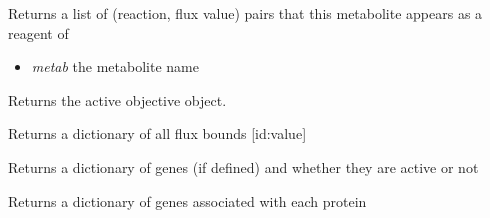 \documentclass[a4paper,11pt,english]{sphinxmanual}
\begin{document}
\begin{fulllineitems}
\begin{fulllineitems}
\end{fulllineitems}


\begin{fulllineitems}
\label{modules_doc:cbmpy.CBModel.Model.findFluxesForConnectedSpecies}
Returns a list of (reaction, flux value) pairs that this metabolite appears as a reagent of
\begin{itemize}
\item {} 
\emph{metab} the metabolite name

\end{itemize}

\end{fulllineitems}


\begin{fulllineitems}
\label{modules_doc:cbmpy.CBModel.Model.getActiveObjective}
Returns the active objective object.

\end{fulllineitems}


\begin{fulllineitems}
\label{modules_doc:cbmpy.CBModel.Model.getAllFluxBounds}
Returns a dictionary of all flux bounds {[}id:value{]}

\end{fulllineitems}


\begin{fulllineitems}
\label{modules_doc:cbmpy.CBModel.Model.getAllGeneActivities}
Returns a dictionary of genes (if defined) and whether they are active or not

\end{fulllineitems}


\begin{fulllineitems}
\label{modules_doc:cbmpy.CBModel.Model.getAllGeneProteinAssociations}
Returns a dictionary of genes associated with each protein


\end{fulllineitems}
\end{fulllineitems}
\end{document}

